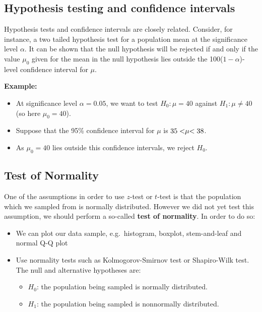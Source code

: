 \documentclass[
]{article}
\providecommand{\tightlist}{%
  \setlength{\itemsep}{0pt}\setlength{\parskip}{0pt}}
\begin{document}
\hypertarget{hypothesis-testing-and-confidence-intervals}{%
\subsection{Hypothesis testing and confidence
intervals}\label{hypothesis-testing-and-confidence-intervals}}

Hypothesis tests and confidence intervals are closely related. Consider,
for instance, a two tailed hypothesis test for a population mean at the
significance level \(\alpha\). It can be shown that the null hypothesis
will be rejected if and only if the value \(\mu_0\) given for the mean
in the null hypothesis lies outside the 100(\(1-\alpha\))-level
confidence interval for \(\mu\).

\textbf{Example:}

\begin{itemize}
\tightlist
\item
  At significance level \(\alpha=0.05\), we want to test
  \(H_0: \mu = 40\) against \(H_1: \mu \neq 40\) (so here \(\mu_0=40\)).
\item
  Suppose that the 95\% confidence interval for \(\mu\) is
  \(35<\hspace{-1mm}\mu\hspace{-1mm}<38\).
\item
  As \(\mu_0=40\) lies outside this confidence intervals, we reject
  \(H_0\).
\end{itemize}

\hypertarget{test-of-normality}{%
\subsection{Test of Normality}\label{test-of-normality}}

One of the assumptions in order to use \(z\)-test or \(t\)-test is that
the population which we sampled from is normally distributed. However we
did not yet test this assumption, we should perform a so-called
\textbf{test of normality}. In order to do so:

\begin{itemize}
\item
  We can plot our data sample, e.g.~histogram, boxplot, stem-and-leaf
  and normal Q-Q plot
\item
  Use normality tests such as Kolmogorov-Smirnov test or Shapiro-Wilk
  test. The null and alternative hypotheses are:

  \begin{itemize}
  \tightlist
  \item
    \(H_0\): the population being sampled is normally distributed.
  \item
    \(H_1\): the population being sampled is nonnormally distributed.
  \end{itemize}
\end{itemize}
\end{document}
